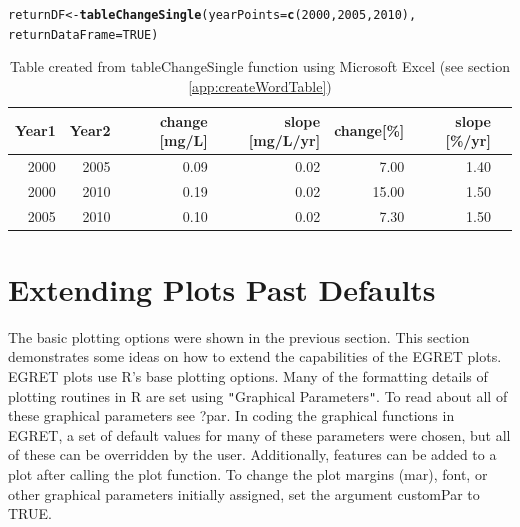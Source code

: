 \documentclass[a4paper,11pt]{article}\usepackage[]{graphicx}\usepackage[]{color}
\makeatletter
\newcommand{\hlnum}[1]{\textcolor[rgb]{0.686,0.059,0.569}{#1}}%
\newcommand{\hlstd}[1]{\textcolor[rgb]{0.345,0.345,0.345}{#1}}%
\newcommand{\hlkwb}[1]{\textcolor[rgb]{0.69,0.353,0.396}{#1}}%
\newcommand{\hlkwc}[1]{\textcolor[rgb]{0.333,0.667,0.333}{#1}}%
\newcommand{\hlkwd}[1]{\textcolor[rgb]{0.737,0.353,0.396}{\textbf{#1}}}%
\newenvironment{kframe}{%
 \def\at@end@of@kframe{}%
 \ifinner\ifhmode%
  \def\at@end@of@kframe{\end{minipage}}%
  \begin{minipage}{\columnwidth}%
 \fi\fi%
 \def\FrameCommand##1{\hskip\@totalleftmargin \hskip-\fboxsep
 \colorbox{shadecolor}{##1}\hskip-\fboxsep
     \hskip-\linewidth \hskip-\@totalleftmargin \hskip\columnwidth}%
 \MakeFramed {\advance\hsize-\width
   \@totalleftmargin\z@ \linewidth\hsize
   \@setminipage}}%
 {\par\unskip\endMakeFramed%
 \at@end@of@kframe}
\newenvironment{knitrout}{}{} %
\makeatother
\begin{document}
\begin{knitrout}
\color{fgcolor}\begin{kframe}
\begin{alltt}
\hlstd{returnDF} \hlkwb{<-} \hlkwd{tableChangeSingle}\hlstd{(}\hlkwc{yearPoints}\hlstd{=}\hlkwd{c}\hlstd{(}\hlnum{2000}\hlstd{,}\hlnum{2005}\hlstd{,}\hlnum{2010}\hlstd{),}
                              \hlkwc{returnDataFrame}\hlstd{=}\hlnum{TRUE}\hlstd{)}
\end{alltt}
\end{kframe}
\end{knitrout}

\begin{table}[ht]
\centering
\begin{tabular}{rrrrrrr}
  \hline
Year1 & Year2 & change [mg/L] & slope [mg/L/yr] & change[\%] & slope [\%/yr] \\ 
  \hline
2000 & 2005 & 0.09 & 0.02 & 7.00 & 1.40 \\ 
2000 & 2010 & 0.19 & 0.02 & 15.00 & 1.50 \\ 
2005 & 2010 & 0.10 & 0.02 & 7.30 & 1.50 \\ 
   \hline
\end{tabular}
\caption{Table created from tableChangeSingle function using Microsoft Excel (see section \ref{app:createWordTable})} 
\label{table:tableChangeSingle}
\end{table}


\clearpage

\FloatBarrier


\section{Extending Plots Past Defaults}
\label{sec:extendedPlots}

\FloatBarrier

The basic plotting options were shown in the previous section.  This section demonstrates some ideas on how to extend the capabilities of the EGRET plots. EGRET plots use R's base plotting options. Many of the formatting details of plotting routines in R are set using \texttt{"}Graphical Parameters\texttt{"}.  To read about all of these graphical parameters see ?par.  In coding the graphical functions in EGRET, a set of default values for many of these parameters were chosen, but all of these can be overridden by the user. Additionally, features can be added to a plot after calling the plot function. To change the plot margins (mar), font, or other graphical parameters initially assigned, set the argument customPar to TRUE.
\end{document}
